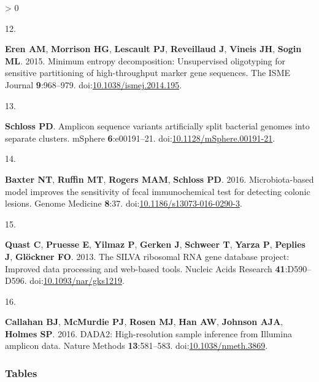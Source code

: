 \documentclass[
]{article}
\newlength{\cslhangindent}
\newlength{\csllabelwidth}
\newenvironment{CSLReferences}[2] %
 {%
  \setlength{\parindent}{0pt}
  \ifodd #1 \everypar{\setlength{\hangindent}{\cslhangindent}}\ignorespaces\fi
  \ifnum #2 > 0
  \setlength{\parskip}{#2\baselineskip}
  \fi
 }%
 {}
\newcommand{\CSLLeftMargin}[1]{\parbox[t]{\csllabelwidth}{#1}}
\newcommand{\CSLRightInline}[1]{\parbox[t]{\linewidth - \csllabelwidth}{#1}\break}
\begin{document}
\begin{CSLReferences}{0}{0}
\leavevmode\hypertarget{ref-eren2015}{}%
\CSLLeftMargin{12. }
\CSLRightInline{\textbf{Eren AM}, \textbf{Morrison HG}, \textbf{Lescault
PJ}, \textbf{Reveillaud J}, \textbf{Vineis JH}, \textbf{Sogin ML}. 2015.
Minimum entropy decomposition: Unsupervised oligotyping for sensitive
partitioning of high-throughput marker gene sequences. The ISME Journal
\textbf{9}:968--979.
doi:\href{https://doi.org/10.1038/ismej.2014.195}{10.1038/ismej.2014.195}.}

\leavevmode\hypertarget{ref-schloss}{}%
\CSLLeftMargin{13. }
\CSLRightInline{\textbf{Schloss PD}. Amplicon sequence variants
artificially split bacterial genomes into separate clusters. mSphere
\textbf{6}:e00191--21.
doi:\href{https://doi.org/10.1128/mSphere.00191-21}{10.1128/mSphere.00191-21}.}

\leavevmode\hypertarget{ref-baxter2016}{}%
\CSLLeftMargin{14. }
\CSLRightInline{\textbf{Baxter NT}, \textbf{Ruffin MT}, \textbf{Rogers
MAM}, \textbf{Schloss PD}. 2016. Microbiota-based model improves the
sensitivity of fecal immunochemical test for detecting colonic lesions.
Genome Medicine \textbf{8}:37.
doi:\href{https://doi.org/10.1186/s13073-016-0290-3}{10.1186/s13073-016-0290-3}.}

\leavevmode\hypertarget{ref-quast2013}{}%
\CSLLeftMargin{15. }
\CSLRightInline{\textbf{Quast C}, \textbf{Pruesse E}, \textbf{Yilmaz P},
\textbf{Gerken J}, \textbf{Schweer T}, \textbf{Yarza P}, \textbf{Peplies
J}, \textbf{Glöckner FO}. 2013. The SILVA ribosomal RNA gene database
project: Improved data processing and web-based tools. Nucleic Acids
Research \textbf{41}:D590--D596.
doi:\href{https://doi.org/10.1093/nar/gks1219}{10.1093/nar/gks1219}.}

\leavevmode\hypertarget{ref-callahan2016}{}%
\CSLLeftMargin{16. }
\CSLRightInline{\textbf{Callahan BJ}, \textbf{McMurdie PJ},
\textbf{Rosen MJ}, \textbf{Han AW}, \textbf{Johnson AJA}, \textbf{Holmes
SP}. 2016. DADA2: High-resolution sample inference from Illumina
amplicon data. Nature Methods \textbf{13}:581--583.
doi:\href{https://doi.org/10.1038/nmeth.3869}{10.1038/nmeth.3869}.}

\end{CSLReferences}

\setlength{\parindent}{0in}
\setlength{\leftskip}{0in}

\newpage

\hypertarget{tables}{%
\subsubsection{Tables}\label{tables}}
\end{document}
